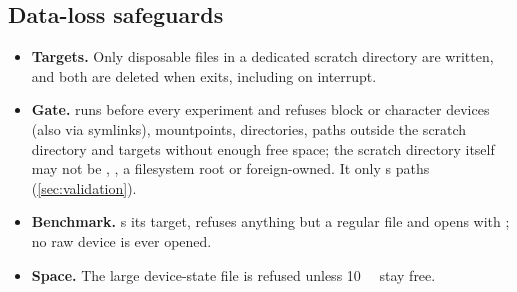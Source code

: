 \subsection{Data-loss safeguards}
\begin{itemize}
  \item \textbf{Targets.} Only disposable files in a dedicated scratch directory are written, and both are
        deleted when  exits, including on interrupt.
  \item \textbf{Gate.}  runs before every experiment and refuses block or character
        devices (also via symlinks), mountpoints, directories, paths outside the scratch directory and
        targets without enough free space; the scratch directory itself may not be \code{/},
        , a filesystem root or foreign-owned. It only s paths
        (\cref{sec:validation}).
  \item \textbf{Benchmark.}  s its target, refuses anything but a regular file
        and opens with ; no raw device is ever opened.
  \item \textbf{Space.} The large device-state file is refused unless \qty{10}{\gibi\byte} stay free.
\end{itemize}

